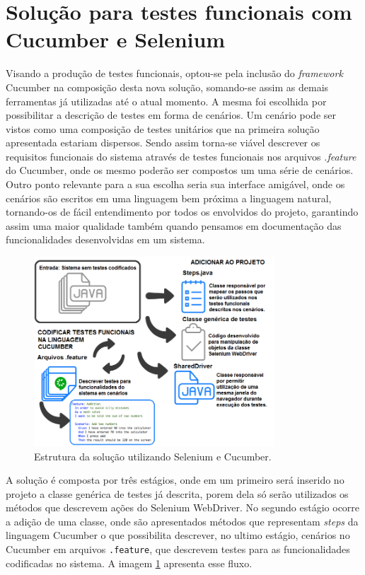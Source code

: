 \documentclass[tg]{mdtufsm}
\begin{document}
\section{Solução para testes funcionais com Cucumber e Selenium}
Visando a produção de testes funcionais, optou-se pela inclusão do \emph{framework} Cucumber na composição desta nova solução, somando-se assim as demais ferramentas já utilizadas até o atual momento. A mesma foi escolhida por possibilitar a descrição de testes em forma de cenários. Um cenário pode ser vistos como uma composição de testes unitários que na primeira solução apresentada estariam dispersos. Sendo assim torna-se viável descrever os requisitos funcionais do sistema através de testes funcionais nos arquivos \emph{.feature} do Cucumber, onde os mesmo poderão ser compostos um uma série de cenários. Outro ponto relevante para a sua escolha seria sua interface amigável, onde os cenários são escritos em uma linguagem bem próxima a linguagem natural, tornando-os de fácil entendimento por todos os envolvidos do projeto, garantindo assim uma maior qualidade também quando pensamos em documentação das funcionalidades desenvolvidas em um sistema.

\begin{figure}[!htb]
	\centering
	\includegraphics[width=0.8\textwidth]{solucao2}
	\caption{Estrutura da solução utilizando Selenium e Cucumber.}
	\label{fig:solucao2}
\end{figure}

A solução é composta por três estágios, onde em um primeiro será inserido no projeto a classe genérica de testes já descrita, porem dela só serão utilizados os métodos que descrevem ações do Selenium WebDriver. No segundo estágio ocorre a adição de uma classe, onde são apresentados métodos que representam \emph{steps} da linguagem Cucumber o que possibilita descrever, no ultimo estágio, cenários no Cucumber em arquivos \texttt{.feature}, que descrevem testes para as funcionalidades codificadas no sistema. A imagem \ref{fig:solucao2} apresenta esse fluxo.
\end{document}
